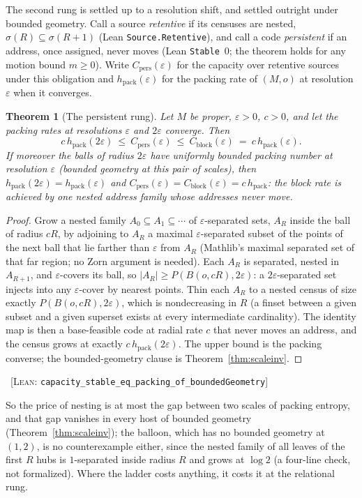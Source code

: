\documentclass[11pt,reqno]{amsart}
\theoremstyle{plain}
\newtheorem{theorem}{Theorem}[section]
\theoremstyle{definition}
\newcommand{\hpack}{h_{\mathrm{pack}}}
\newcommand{\Cblock}{C_{\mathrm{block}}}
\newcommand{\eps}{\varepsilon}
\newcommand{\cert}[1]{{\footnotesize\ [\textsc{Lean}: \texttt{#1}]}}
\begin{document}
The second rung is settled up to a resolution shift, and settled outright under bounded geometry. Call a source \emph{retentive} if its censuses are nested, $\sigma(R)\subseteq\sigma(R{+}1)$ (Lean \texttt{Source.Retentive}), and call a code \emph{persistent} if an address, once assigned, never moves (Lean \texttt{Stable}~$0$; the theorem holds for any motion bound $m\ge0$). Write $C_{\mathrm{pers}}(\eps)$ for the capacity over retentive sources under this obligation and $\hpack(\eps)$ for the packing rate of $(M,o)$ at resolution $\eps$ when it converges.

\begin{theorem}[The persistent rung]\label{thm:persistent}
Let $M$ be proper, $\eps>0$, $c>0$, and let the packing rates at resolutions $\eps$ and $2\eps$ converge. Then
\[
c\,\hpack(2\eps)\ \le\ C_{\mathrm{pers}}(\eps)\ \le\ \Cblock(\eps)\ =\ c\,\hpack(\eps).
\]
If moreover the balls of radius $2\eps$ have uniformly bounded packing number at resolution $\eps$ (bounded geometry at this pair of scales), then $\hpack(2\eps)=\hpack(\eps)$ and $C_{\mathrm{pers}}(\eps)=\Cblock(\eps)=c\,\hpack$: the block rate is achieved by one nested address family whose addresses never move.
\end{theorem}

\begin{proof}
Grow a nested family $A_0\subseteq A_1\subseteq\cdots$ of $\eps$-separated sets, $A_R$ inside the ball of radius $cR$, by adjoining to $A_R$ a maximal $\eps$-separated subset of the points of the next ball that lie farther than $\eps$ from $A_R$ (Mathlib's maximal separated set of that far region; no Zorn argument is needed). Each $A_R$ is separated, nested in $A_{R+1}$, and $\eps$-covers its ball, so $|A_R|\ge P(B(o,cR),2\eps)$: a $2\eps$-separated set injects into any $\eps$-cover by nearest points. Thin each $A_R$ to a nested census of size exactly $P(B(o,cR),2\eps)$, which is nondecreasing in $R$ (a finset between a given subset and a given superset exists at every intermediate cardinality). The identity map is then a base-feasible code at radial rate $c$ that never moves an address, and the census grows at exactly $c\,\hpack(2\eps)$. The upper bound is the packing converse; the bounded-geometry clause is Theorem~\ref{thm:scaleinv}.
\end{proof}\cert{capacity\_stable\_eq\_packing\_of\_boundedGeometry}

So the price of nesting is at most the gap between two scales of packing entropy, and that gap vanishes in every host of bounded geometry (Theorem~\ref{thm:scaleinv}); the balloon, which has no bounded geometry at $(1,2)$, is no counterexample either, since the nested family of all leaves of the first $R$ hubs is $1$-separated inside radius $R$ and grows at $\log2$ (a four-line check, not formalized). Where the ladder costs anything, it costs it at the relational rung.
\end{document}
